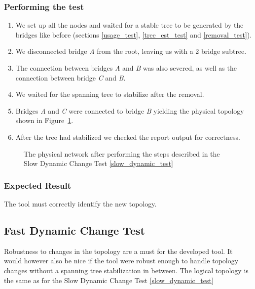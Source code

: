 \subsubsection{Performing the test}
\begin{enumerate}
    \item We set up all the nodes and waited for a stable tree to be generated by the bridges like before (sections \ref{usage_test}, \ref{tree_est_test} and \ref{removal_test}).
    \item We disconnected bridge \textit{A} from the root, leaving us with a 2 bridge subtree.
    \item The connection between bridges \textit{A} and \textit{B} was also severed, as well as the connection between bridge \textit{C} and \textit{B}.
    \item We waited for the spanning tree to stabilize after the removal.
    \item Bridges \textit{A} and \textit{C} were connected to bridge \textit{B} yielding the physical topology shown in Figure~\ref{fig:deep_topology}.
    \item After the tree had stabilized we checked the report output for correctness.
\end{enumerate}

\begin{figure}[hp]
    \centering
    \caption{The physical network after performing the steps described in the Slow Dynamic Change Test \ref{slow_dynamic_test}}
    \label{fig:deep_topology}
\end{figure}

\subsubsection{Expected Result}
The tool must correctly identify the new topology.

\subsection{Fast Dynamic Change Test}
\label{fast_dynamic_test}
Robustness to changes in the topology are a must for the developed tool.
It would however also be nice if the tool were robust enough to handle topology changes without a spanning tree stabilization in between.
The logical topology is the same as for the Slow Dynamic Change Test \ref{slow_dynamic_test}

